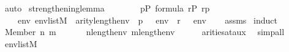 \begin{isabellebody}
\ auto%
\endisatagproof
{\isafoldproof}%
%
\isadelimproof
%
\endisadelimproof
%
\isadelimdocument
%
\endisadelimdocument
%
\isatagdocument
%
\isamarkuptrue%
%
\endisatagdocument
{\isafolddocument}%
%
\isadelimdocument
%
\endisadelimdocument
{}\isamarkupfalse%
\ strengthening{\isacharunderscore}{\kern0pt}lemma{\isacharcolon}{\kern0pt}\isanewline
\ \ \ \isanewline
\ \ \ \ {\isachardoublequoteopen}p{\isasymin}P{\isachardoublequoteclose}\ {\isachardoublequoteopen}{\isasymphi}{\isasymin}formula{\isachardoublequoteclose}\ {\isachardoublequoteopen}r{\isasymin}P{\isachardoublequoteclose}\ {\isachardoublequoteopen}r{\isasympreceq}p{\isachardoublequoteclose}\isanewline
\ \ \isanewline
\ \ \ \ {\isachardoublequoteopen}{\isasymAnd}env{\isachardot}{\kern0pt}\ env{\isasymin}list{\isacharparenleft}{\kern0pt}M{\isacharparenright}{\kern0pt}\ {\isasymLongrightarrow}\ arity{\isacharparenleft}{\kern0pt}{\isasymphi}{\isacharparenright}{\kern0pt}{\isasymle}length{\isacharparenleft}{\kern0pt}env{\isacharparenright}{\kern0pt}\ {\isasymLongrightarrow}\ p\ {\isasymtturnstile}\ {\isasymphi}\ env\ {\isasymLongrightarrow}\ r\ {\isasymtturnstile}\ {\isasymphi}\ env{\isachardoublequoteclose}\isanewline
%
\isadelimproof
\ \ %
\endisadelimproof
%
\isatagproof
{}\isamarkupfalse%
\ assms{\isacharparenleft}{\kern0pt}{}{\isacharparenright}{\kern0pt}\isanewline
{}\isamarkupfalse%
\ {\isacharparenleft}{\kern0pt}induct{\isacharparenright}{\kern0pt}\isanewline
\ \ \isamarkupfalse%
\ {\isacharparenleft}{\kern0pt}Member\ n\ m{\isacharparenright}{\kern0pt}\isanewline
\ \ \isamarkupfalse%
\isanewline
\ \ \isamarkupfalse%
\ {\isachardoublequoteopen}n{\isacharless}{\kern0pt}length{\isacharparenleft}{\kern0pt}env{\isacharparenright}{\kern0pt}{\isachardoublequoteclose}\ {\isachardoublequoteopen}m{\isacharless}{\kern0pt}length{\isacharparenleft}{\kern0pt}env{\isacharparenright}{\kern0pt}{\isachardoublequoteclose}\isanewline
\ \ \ \ \isamarkupfalse%
\ arities{\isacharunderscore}{\kern0pt}at{\isacharunderscore}{\kern0pt}aux\ \isamarkupfalse%
\ simp{\isacharunderscore}{\kern0pt}all\isanewline
\ \ \isamarkupfalse%
\isanewline
\ \ \isamarkupfalse%
\ {\isachardoublequoteopen}env{\isasymin}list{\isacharparenleft}{\kern0pt}M{\isacharparenright}{\kern0pt}{\isachardoublequoteclose}\isanewline
\ \ \isamarkupfalse%
\isanewline
\ \ \isamarkupfalse%

\end{isabellebody}
